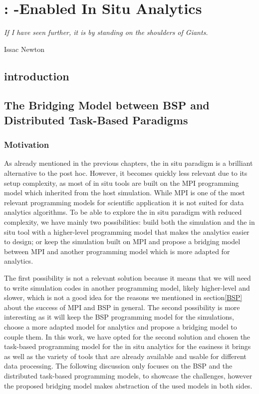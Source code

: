 \chapter{\deisa: \dask-Enabled In Situ Analytics}



\epigraph{\textit{If I have seen further, it is by standing on the shoulders of Giants.}} {Issac Newton}



\section{introduction}

\section{The Bridging Model between BSP and Distributed Task-Based Paradigms}\label{sec:btp}

\subsection{Motivation}\label{sec:btp:motivation}
As already mentioned in the previous chapters, the in situ paradigm is a brilliant alternative to the post hoc. However, it becomes quickly less relevant due to its setup complexity, as most of in situ tools are built on the MPI programming model which inherited from the host simulation. While MPI is one of the most relevant programming models for scientific application it is not suited for data analytics algorithms. To be able to explore the in situ paradigm with reduced complexity, we have mainly two possibilities: build both the simulation and the in situ tool with a higher-level programming model that makes the analytics easier to design; or keep the simulation built on MPI and propose a bridging model between MPI and another programming model which is more adapted for analytics.

The first possibility is not a relevant solution because it means that we will need to write simulation codes in another programming model, likely higher-level and slower, which is not a good idea for the reasons we mentioned in section\ref{BSP} about the success of MPI and BSP in general. 
The second possibility is more interesting as it will keep the BSP programming model for the simulations, choose a more adapted model for analytics and propose a bridging model to couple them. 
In this work, we have opted for the second solution and chosen the task-based programming model for the in situ analytics for the easiness it brings as well as the variety of tools that are already available and usable for different data processing. The following discussion only focuses on the BSP and the distributed task-based programming models, to showcase the challenges, however the proposed bridging model makes abstraction of the used models in both sides.  

